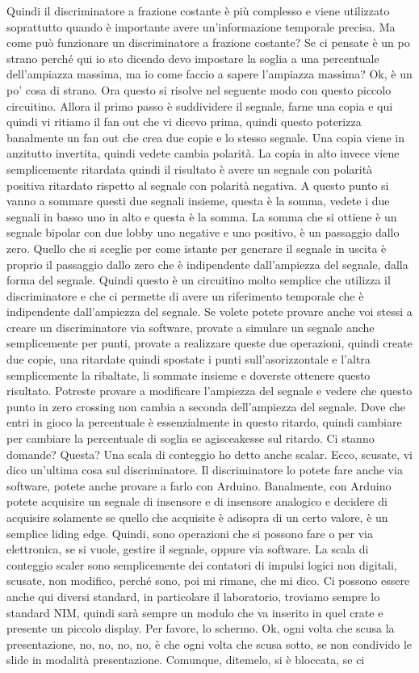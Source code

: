 {Quindi il discriminatore a frazione costante è più complesso e viene utilizzato soprattutto quando è importante avere un'informazione temporale precisa. Ma come può funzionare un discriminatore a frazione costante? Se ci pensate è un po strano perché qui io sto dicendo devo impostare la soglia a una percentuale dell'ampiazza massima, ma io come faccio a sapere l'ampiazza massima? Ok, è un po' cosa di strano. Ora questo si risolve nel seguente modo con questo piccolo circuitino. Allora il primo passo è suddividere il segnale, farne una copia e qui quindi vi ritiamo il fan out che vi dicevo prima, quindi questo poterizza banalmente un fan out che crea due copie e lo stesso segnale. Una copia viene in anzitutto invertita, quindi vedete cambia polarità. La copia in alto invece viene semplicemente ritardata quindi il risultato è avere un segnale con polarità positiva ritardato rispetto al segnale con polarità negativa. A questo punto si vanno a sommare questi due segnali insieme, questa è la somma, vedete i due segnali in basso uno in alto e questa è la somma. La somma che si ottiene è un segnale bipolar con due lobby uno negative e uno positivo, è un passaggio dallo zero. Quello che si sceglie per come istante per generare il segnale in uscita è proprio il passaggio dallo zero che è indipendente dall'ampiezza del segnale, dalla forma del segnale. Quindi questo è un circuitino molto semplice che utilizza il discriminatore e che ci permette di avere un riferimento temporale che è indipendente dall'ampiezza del segnale. Se volete potete provare anche voi stessi a creare un discriminatore via software, provate a simulare un segnale anche semplicemente per punti, provate a realizzare queste due operazioni, quindi create due copie, una ritardate quindi spostate i punti sull'asorizzontale e l'altra semplicemente la ribaltate, li sommate insieme e doverste ottenere questo risultato. Potreste provare a modificare l'ampiezza del segnale e vedere che questo punto in zero crossing non cambia a seconda dell'ampiezza del segnale. Dove che entri in gioco la percentuale è essenzialmente in questo ritardo, quindi cambiare per cambiare la percentuale di soglia se agisceakesse sul ritardo. Ci stanno domande? Questa? Una scala di conteggio ho detto anche scalar. Ecco, scusate, vi dico un'ultima cosa sul discriminatore. Il discriminatore lo potete fare anche via software, potete anche provare a farlo con Arduino. Banalmente, con Arduino potete acquisire un segnale di insensore e di insensore analogico e decidere di acquisire solamente se quello che acquisite è adisopra di un certo valore, è un semplice liding edge. Quindi, sono operazioni che si possono fare o per via elettronica, se si vuole, gestire il segnale, oppure via software. La scala di conteggio scaler sono semplicemente dei contatori di impulsi logici non digitali, scusate, non modifico, perché sono, poi mi rimane, che mi dico. Ci possono essere anche qui diversi standard, in particolare il laboratorio, troviamo sempre lo standard NIM, quindi sarà sempre un modulo che va inserito in quel crate e presente un piccolo display. Per favore, lo schermo. Ok, ogni volta che scusa la presentazione, no, no, no, no, è che ogni volta che scusa sotto, se non condivido le slide in modalità presentazione. Comunque, ditemelo, si è bloccata, se ci }
